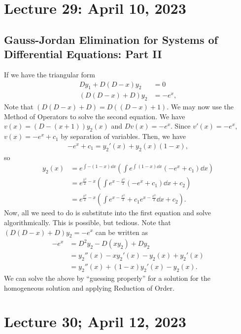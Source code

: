 \pagebreak

\section{Lecture 29: April 10, 2023}

    \subsection{Gauss-Jordan Elimination for Systems of Differential Equations: Part II}

        If we have the triangular form
        \begin{align*}
            Dy_1+D(D-x)y_2&=0 \\
            (D(D-x)+D)y_2&=-e^x,
        \end{align*}
        Note that \((D(D-x)+D)=D((D-x)+1)\). We may now use the Method of Operators to solve the second equation. We have \(v(x)=(D-(x+1))y_2(x)\) and \(Dv(x)=-e^x\). Since \(v'(x)=-e^x\), \(v(x)=-e^{x}+c_1\) by separation of variables. Then, we have
        \begin{align*}
            -e^x+c_1=y_2'(x)+y_2(x)(1-x),
        \end{align*}
        so
        \begin{align*}
            y_2(x)&=e^{\int -(1-x)\dd x}\left(\int e^{\int (1-x)\dd x}(-e^x+c_1)\dd x\right) \\
            &=e^{\frac{x^2}{2}-x}\left(\int e^{x-\frac{x^2}{2}}(-e^x+c_1)\dd x+c_2\right) \\
            &=e^{\frac{x^2}{2}-x}\left(\int e^{x-\frac{x^2}{2}}+c_1e^{x-\frac{x^2}{2}}\dd x+c_2\right).
        \end{align*}
        Now, all we need to do is substitute into the first equation and solve algorithmically. This is possible, but tedious. Note that \((D(D-x)+D)y_2=-e^x\) can be written as
        \begin{align*}
            -e^x&=D^2y_2-D(xy_2)+Dy_2 \\
            &=y_2''(x)-xy_2'(x)-y_2(x)+y_2'(x) \\
            &=y_2''(x)+(1-x)y_2'(x)-y_2(x).
        \end{align*}
        We can solve the above by ``guessing properly'' for a solution for the homogeneous solution and applying Reduction of Order.

    \pagebreak

\section{Lecture 30; April 12, 2023}

